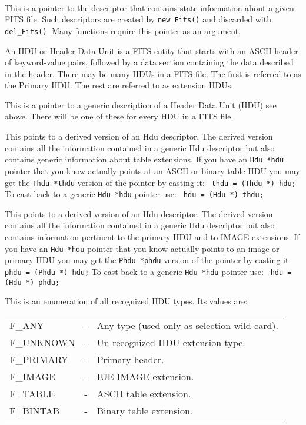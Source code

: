 \begin{list}{\ }{ \leftmargin {} \addtolength{\leftmargin}{\labelsep}}
\def\gitem#1{\item[\verb`#1` \hfill]}
\gitem{Fits *} This is a pointer to the descriptor that contains state
        information about a given FITS file. Such descriptors
        are created by \verb`new_Fits()` and discarded with \verb`del_Fits()`.
        Many functions require this pointer as an argument.

\gitem{HDU} An HDU or Header-Data-Unit is a FITS entity that starts
	with an ASCII header of keyword-value pairs, followed by
        a data section containing the data described in the header.
        There may be many HDUs in a FITS file. The first is referred
        to as the Primary HDU. The rest are referred to as extension
        HDUs.

\gitem{Hdu *}  This is a pointer to a generic description of a Header
        Data Unit (HDU) see above. There will be one of these for
        every HDU in a FITS file.

\gitem{Thdu *}  This points to a derived version of an Hdu descriptor.
        The derived version contains all the information contained in a
        generic Hdu descriptor but also contains generic information
        about table extensions. 
        If you have an \verb`Hdu *hdu` pointer that you know actually points
        at an ASCII or binary table HDU you may get the \verb`Thdu *thdu`
        version of the pointer by casting it: \verb` thdu = (Thdu *) hdu;`
	To cast back to a generic \verb`Hdu *hdu` pointer use: 
	\verb` hdu = (Hdu *) thdu;`

\gitem{Phdu *} This points to a derived version of an Hdu descriptor. The
        derived version contains  all the information contained in a
        generic Hdu descriptor but also contains information pertinent
        to the primary HDU and to IMAGE extensions.
        If you have an \verb`Hdu *hdu` pointer that you know actually points
        to an image or primary HDU you may get the \verb`Phdu *phdu` version
        of the pointer by casting it: \verb` phdu = (Phdu *) hdu;`
	To cast back to a generic \verb`Hdu *hdu` pointer use: 
	\verb` hdu = (Hdu *) phdu;`

\gitem{Hdutype}\label{Hdutype} This is an enumeration of all
        recognized HDU types. Its values are:\nopagebreak

        \begin{tabular}{lcl}
          F\_ANY     & - & Any type (used only as selection wild-card). \\
          F\_UNKNOWN & - & Un-recognized HDU extension type. \\
          F\_PRIMARY & - & Primary header. \\
          F\_IMAGE   & - & IUE IMAGE extension. \\
          F\_TABLE   & - & ASCII table extension. \\
          F\_BINTAB  & - & Binary table extension. \\
        \end{tabular}


\end{list}

